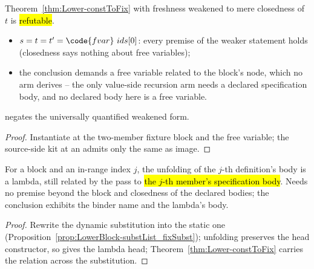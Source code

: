 \begin{lemma}
\label{lem:LowerFixFixture-constToFix_needs_freshness}
\leanok
{}
 Theorem~\ref{thm:Lower-constToFix} with freshness weakened to mere closedness of $t$ is
\hl{refutable}.
\begin{itemize}
\item {} $s = t = t' = \code{fvar}\ ids[0]$: every premise of the weaker statement holds
(closedness says nothing about free variables);
\item {} the conclusion demands a free variable related to the block's node, which no arm
derives -- the only value-side recursion arm needs a declared specification body, and no declared body
here is a free variable.
\end{itemize}
 negates the universally quantified weakened form.
\end{lemma}
\begin{proof}
\leanok
{}
 Instantiate at the two-member fixture block and the free variable; the source-side kit at
an  admits only the same  as image.
\end{proof}

\begin{proposition}
\label{prop:Lower-fixUnfold}
\leanok
{}
 For a block and an in-range index $j$, the unfolding of the $j$-th definition's body is
a lambda, still related by the pass to \hl{the $j$-th member's specification body}.
 Needs no premise beyond the block and closedness of the declared
bodies; the conclusion exhibits the binder name and the lambda's body.
\end{proposition}
\begin{proof}
\leanok
{}
 Rewrite the dynamic substitution into the static one
(Proposition~\ref{prop:LowerBlock-substList_fixSubst}); unfolding preserves the head constructor, so
 gives the lambda head; Theorem~\ref{thm:Lower-constToFix} carries the relation across the
substitution.
\end{proof}

